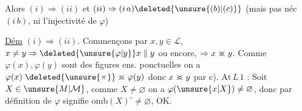 Alors $(i)\Rightarrow(ii)$ et $(ii)\Rightarrow(i\,a)\deleted{\unsure{(b)|(c)}}$ (mais pas néc $(i\,b)$,  ni l'injectivité de $\varphi$)

\uline{Dém} $(i)\Rightarrow(ii)$.  Commençons par $x,y\in\mathcal L$, $x\ne y\Rightarrow\deleted{\unsure{\varphi|y}}x\parallel y$ ou encore, $\Rightarrow x\mathrel{>\mkern-13mu<}y$. Comme $\varphi(x),\varphi(y)$ sont des  figures ens. ponctuelles on a $\varphi(x)\mathrel{\deleted{\unsure{\times}}>\mkern-13mu<}\varphi(y)$ donc $x\mathrel{>\mkern-13mu<}y$ par c). $\mathrm{At}\,L\,1$ : Soit $X\in\unsure{M|\mathcal M}$,  comme $X\ne\varnothing$ on a $\varphi(\unsure{x|X})\ne\varnothing$, donc par définition de $\varphi$  signifie $\mathrm{omb}(X)^{\circ}\ne\varnothing$,  OK.

